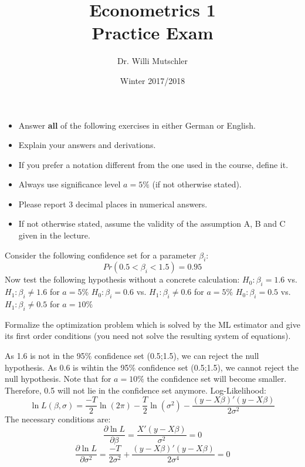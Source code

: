 \documentclass{article}
\begin{document}
	
	\title{Econometrics 1 \\ \small Practice Exam}
	\author{Dr. Willi Mutschler}
	\date{Winter 2017/2018}
	\maketitle
	
	\begin{itemize}
		\item Answer \textbf{all} of the following exercises in either German or English.
		\item Explain your answers and derivations.
		\item If you prefer a notation different from the one used in the course, define it.
		\item Always use significance level $a=5\%$ (if not otherwise stated).
		\item Please report 3 decimal places in numerical answers.
		\item If not otherwise stated, assume the validity of the assumption A, B and C given in the lecture.
	\end{itemize}
\newpage
\begin{Exercise}[title=(Understanding)]
	
\Question Consider the following confidence set for a parameter $\beta_i$:
$$Pr(0.5 < \beta_i < 1.5) = 0.95$$
Now test the following hypothesis without a concrete calculation:
\subQuestion $H_0: \beta_i = 1.6$ vs. $H_1:\beta_i \neq 1.6$ for $a=5\%$
\subQuestion $H_0: \beta_i = 0.6$ vs. $H_1:\beta_i \neq 0.6$ for $a=5\%$
\subQuestion $H_0: \beta_i = 0.5$ vs. $H_1:\beta_i \neq 0.5$ for $a=10\%$

\Question Formalize the optimization problem which is solved by the ML estimator and give its first order conditions (you need not solve the
resulting system of equations).
\end{Exercise}

\begin{Answer}
\Question
\subQuestion
As 1.6 is not in the 95\% confidence set (0.5;1.5), we can reject the null hypothesis.
\subQuestion
As 0.6 is wihtin the 95\% confidence set (0.5;1.5), we cannot reject the null hypothesis.
\subQuestion
Note that for $a=10\%$ the confidence set will become smaller. Therefore, 0.5 will not lie in the confidence set anymore.
\Question
Log-Likelihood: $$\ln L(\beta,\sigma) = \frac{-T}{2}\ln(2\pi) - \frac{T}{2}\ln(\sigma^2) - \frac{(y-X\beta)'(y-X\beta)}{2\sigma^2}$$
The necessary conditions are:
$$\frac{\partial \ln L}{\partial \beta} = \frac{X'(y-X\beta)}{\sigma^2} = 0$$
$$\frac{\partial \ln L}{\partial \sigma^2} = \frac{-T}{2\sigma^2} + \frac{(y-X\beta)'(y-X\beta)}{2\sigma^4} = 0$$
\end{Answer}
\newpage
\end{document}
